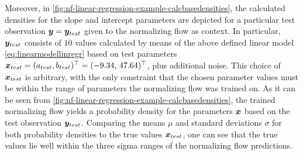 \documentclass[a4paper,12pt]{report}
\begin{document}
Moreover, in \cref{fig:nf-linear-regression-example-calcbasedensities}, the calculated densities for the slope and intercept parameters are depicted for a particular test observation $\bm{y} = \bm{y}_{test}$ given to the normalizing flow as context. In particular, $\bm{y}_{test}$ consists of $10$ values calculated by means of the above defined linear model \cref{eq:linearmodellinregr} based on test parameters $\bm{x}_{test} = (a_{test},b_{test})^\top = (-9.34, \,47.64)^\top$, plus additional noise. This choice of $\bm{x}_{test}$ is arbitrary, with the only constraint that the chosen parameter values must be within the range of parameters the normalizing flow was trained on. As it can be seen from \cref{fig:nf-linear-regression-example-calcbasedensities}, the trained normalizing flow yields a probability density for the parameters $\bm{x}$ based on the test observation $\bm{y}_{test}$. Comparing the means $\mu$ and standard deviations $\sigma$ for both probability densities to the true values $\bm{x}_{test}$, one can see that the true values lie well within the three sigma ranges of the normalizing flow predictions.
\end{document}

